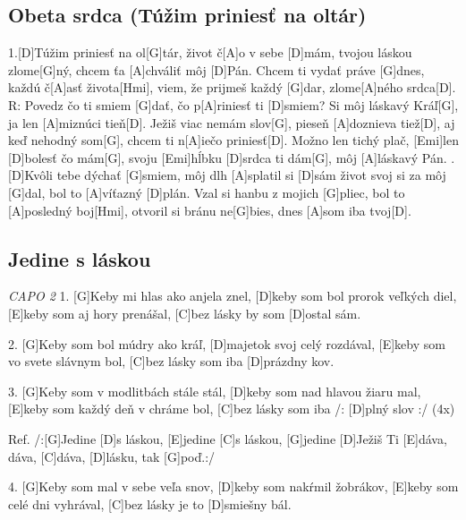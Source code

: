 \documentclass[10pt]{article}
\begin{document}
\begin{Large}
\begin{minipage}{\textwidth}
\subsection{Obeta srdca (Túžim priniesť na oltár)}
\begin{multicols*}{3}
\begin{guitar}
	1.[D]Túžim priniesť na ol[G]tár, 
	život č[A]o v sebe [D]mám,
	tvojou láskou zlome[G]ný, 
	chcem ťa [A]chváliť môj [D]Pán.
	Chcem ti vydať práve [G]dnes, 
	každú č[A]asť života[Hmi],
	viem, že prijmeš každý [G]dar, 
	zlome[A]ného srdca[D].
	\columnbreak
	R:
	Povedz čo ti smiem [G]dať, 
	čo p[A]riniesť ti [D]smiem?
	Si môj láskavý Kráľ[G], 
	ja len [A]miznúci tieň[D].
	Ježiš viac nemám slov[G], 
	pieseň [A]doznieva tiež[D],
	aj keď nehodný som[G], 
	chcem ti n[A]iečo priniesť[D].
	Možno len tichý plač, 
	[Emi]len [D]bolesť čo mám[G],
	svoju [Emi]hĺbku [D]srdca ti dám[G], 
	môj [A]láskavý Pán.
	.[D]Kvôli tebe dýchať [G]smiem, 
	môj dlh [A]splatil si [D]sám
	život svoj si za môj [G]dal, 
	bol to [A]víťazný [D]plán.
	Vzal si hanbu z mojich [G]pliec, 
	bol to [A]posledný boj[Hmi], 
	otvoril si bránu ne[G]bies, 
	dnes [A]som iba tvoj[D].
\end{guitar}
\end{multicols*}
\end{minipage}

\begin{minipage}{\textwidth}
\subsection{Jedine s láskou}
\begin{guitar}
	\textit{CAPO 2}
	1.
	[G]Keby mi hlas ako anjela znel, [D]keby som bol prorok veľkých diel,
	[E]keby som aj hory prenášal, [C]bez lásky by som [D]ostal sám.
	
	2.
	[G]Keby som bol múdry ako kráľ, [D]majetok svoj celý rozdával,
	[E]keby som vo svete slávnym bol, [C]bez lásky som iba [D]prázdny kov.
	
	3.
	[G]Keby som v modlitbách stále stál, [D]keby som nad hlavou žiaru mal,
	[E]keby som každý deň v chráme bol, [C]bez lásky som iba /: [D]plný slov :/ (4x)
	
	
	Ref.
	/:[G]Jedine [D]s láskou, [E]jedine [C]s láskou,
	[G]jedine [D]Ježiš Ti [E]dáva, dáva, [C]dáva, [D]lásku, tak [G]poď.:/ 
	
	4.
	[G]Keby som mal v sebe veľa snov, [D]keby som nakŕmil žobrákov,
	[E]keby som celé dni vyhrával, [C]bez lásky je to [D]smiešny bál.
	

\end{guitar}
\end{minipage}
\end{Large}
\end{document}
